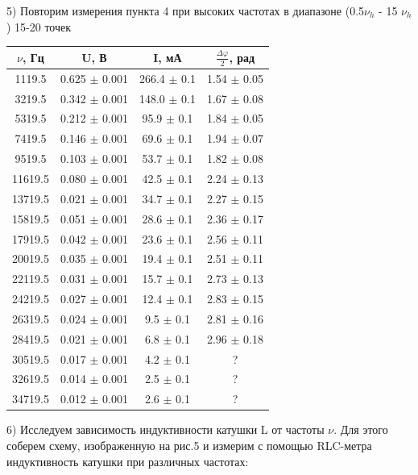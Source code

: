 \documentclass[a4paper,12pt]{article}
\begin{document}
\par5) Повторим измерения пункта 4 при высоких частотах в диапазоне (0.5$\nu_h$ - 15 $\nu_h$) 15-20 точек\\

\begin{center}
\begin{tabular}{|c|c|c|c|}
	\hline
	$\nu$, Гц & U, В & I, мА & $\frac{\Delta\varphi}{2}$, рад \\
	\hline
	1119.5 & 0.625 $\pm$ 0.001 & 266.4 $\pm$ 0.1 & 1.54 $\pm$ 0.05 \\
	\hline
	3219.5 & 0.342 $\pm$ 0.001 & 148.0 $\pm$ 0.1 & 1.67 $\pm$ 0.08 \\
	\hline
	5319.5 & 0.212 $\pm$ 0.001 & 95.9 $\pm$ 0.1 & 1.84 $\pm$ 0.05 \\
	\hline
	7419.5 & 0.146 $\pm$ 0.001 & 69.6 $\pm$ 0.1 & 1.94 $\pm$ 0.07\\
	\hline
	9519.5 & 0.103 $\pm$ 0.001 & 53.7 $\pm$ 0.1 & 1.82 $\pm$ 0.08\\
	\hline
	11619.5 & 0.080 $\pm$ 0.001 & 42.5 $\pm$ 0.1 & 2.24 $\pm$ 0.13\\
	\hline
	13719.5 & 0.021 $\pm$ 0.001 & 34.7 $\pm$ 0.1 & 2.27 $\pm$ 0.15\\
	\hline 
	15819.5 & 0.051 $\pm$ 0.001 & 28.6 $\pm$ 0.1 & 2.36 $\pm$ 0.17 \\
	\hline
	17919.5 & 0.042 $\pm$ 0.001 & 23.6 $\pm$ 0.1 & 2.56 $\pm$ 0.11 \\
	\hline
	20019.5 & 0.035 $\pm$ 0.001 & 19.4 $\pm$ 0.1 & 2.51 $\pm$ 0.11 \\ 
	\hline
	22119.5 & 0.031 $\pm$ 0.001 & 15.7 $\pm$ 0.1 & 2.73 $\pm$ 0.13 \\
	\hline
	24219.5 & 0.027 $\pm$ 0.001 & 12.4 $\pm$ 0.1 & 2.83 $\pm$ 0.15 \\
	\hline
	26319.5 & 0.024 $\pm$ 0.001 & 9.5 $\pm$ 0.1 & 2.81 $\pm$ 0.16 \\
	\hline
	28419.5 & 0.021 $\pm$ 0.001 & 6.8 $\pm$ 0.1 & 2.96 $\pm$ 0.18 \\
	\hline
	30519.5 & 0.017 $\pm$ 0.001 & 4.2 $\pm$ 0.1 & ? \\
	\hline
	32619.5 & 0.014 $\pm$ 0.001 & 2.5 $\pm$ 0.1 & ? \\
	\hline
	34719.5 & 0.012 $\pm$ 0.001 & 2.6 $\pm$ 0.1 & ? \\
	\hline
\end{tabular}  
\end{center}

\par6) Исследуем зависимость индуктивности катушки L от частоты $\nu$. Для этого соберем схему, изображенную на рис.5 и измерим с помощью RLC-метра индуктивность катушки при различных частотах:\\
\end{document}
